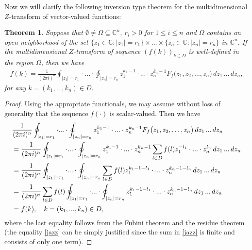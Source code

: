 \documentclass{amsart}
\newtheorem{thm}{Theorem}[section]
\theoremstyle{definition}
\theoremstyle{remark}
\numberwithin{equation}{section}
\begin{document}
Now we will clarify the following inversion type theorem for the multidimensional $Z$-transform of vector-valued functions:

\begin{thm}\label{seka}
Suppose that $\emptyset \neq \Omega \subseteq {\mathbb C}^{n}$, $r_{i}>0$ for $1\leq i\leq n$ and $\Omega$ contains an open neighborhood of the set $\{z_{1}\in {\mathbb C} : |z_{1}|=r_{1}\} \times ... \times \{z_{n}\in {\mathbb C} : |z_{n}|=r_{n}\}$ in ${\mathbb C}^{n}.$ If the multidimensional $Z$-transform of sequence $(f(k))_{k\in D}$ is well-defined in the region $\Omega$, then we have
\begin{align}\label{est121inv}
f(k)=\frac{1}{(2\pi i)^{n}}\oint_{|z_{1}|=r_{1}}\cdot ... \cdot \oint_{|z_{n}|=r_{n}}z_{1}^{k_{1}-1}\cdot ... \cdot z_{n}^{k_{n}-1}
F_{f}\bigl(z_{1},z_{2},\ldots ,z_{n}\bigr)\, dz_{1}\, ...\, dz_{n},
\end{align}
for any $k=(k_{1},...,k_{n})\in D.$
\end{thm}

\begin{proof}
Using the appropriate functionals, we may assume without loss of generality that the sequence $f(\cdot)$ is scalar-valued. Then we have
\begin{align}& \notag
\frac{1}{(2\pi i)^{n}}\oint_{|z_{1}|=r_{1}}\cdot ... \cdot \oint_{|z_{n}|=r_{n}}z_{1}^{k_{1}-1}\cdot ... \cdot z_{n}^{k_{n}-1}
F_{f}\bigl(z_{1},z_{2},\ldots ,z_{n}\bigr)\, dz_{1}\, ...\, dz_{n}
\\\notag& =\frac{1}{(2\pi i)^{n}}\oint_{|z_{1}|=r_{1}}\cdot ... \cdot \oint_{|z_{n}|=r_{n}}z_{1}^{k_{1}-1}\cdot ... \cdot z_{n}^{k_{n}-1}\sum_{l\in D}f(l)z_{1}^{-l_{1}}\cdot ... \cdot z_{n}^{l_{n}}\, dz_{1}\, ...\, dz_{n}
\\\notag& =\frac{1}{(2\pi i)^{n}}\oint_{|z_{1}|=r_{1}}\cdot ... \cdot \oint_{|z_{n}|=r_{n}}\sum_{l\in D}f(l)z_{1}^{k_{1}-1-l_{1}}\cdot ... \cdot z_{n}^{k_{n}-1-l_{n}}\, dz_{1}\, ...\, dz_{n}
\\\label{jazz}& =\frac{1}{(2\pi i)^{n}}\sum_{l\in D}f(l)\oint_{|z_{1}|=r_{1}}\cdot ... \cdot \oint_{|z_{n}|=r_{n}}z_{1}^{k_{1}-1-l_{1}}\cdot ... \cdot z_{n}^{k_{n}-1-l_{n}}\, dz_{1}\, ...\, dz_{n}
\\\notag & =f(k),\quad k=(k_{1},...,k_{n})\in D,
\end{align}
where the last equality follows from the Fubini theorem and the residue theorem (the equality \eqref{jazz} can be simply justified since the sum in \eqref{jazz} is finite and consists of only one term).
\end{proof}
\end{document}
